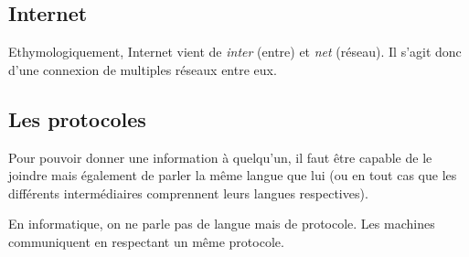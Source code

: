 
\subsection{Internet}

Ethymologiquement, Internet vient de \textit{inter} (entre) et \textit{net} (réseau). Il s'agit donc d'une connexion de multiples réseaux entre eux.




\subsection{Les protocoles}
Pour pouvoir donner une information à quelqu'un, il faut être capable de le joindre mais également de parler la même langue que lui (ou en tout cas que les différents intermédiaires comprennent leurs langues respectives).

En informatique, on ne parle pas de langue mais de protocole. Les machines communiquent en respectant un même protocole.

